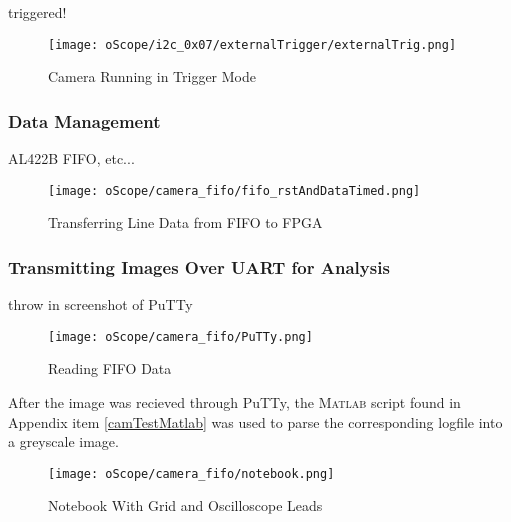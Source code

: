 \par
triggered!

\begin{figure}[H]
	\centerline{\texttt{[image: oScope/i2c\_0x07/externalTrigger/externalTrig.png]}}
	\caption{Camera Running in Trigger Mode}
	\label{camInTrigMode}
\end{figure}


\subsubsection{Data Management}
AL422B FIFO, etc...

\begin{figure}[H]
	\centerline{\texttt{[image: oScope/camera\_fifo/fifo\_rstAndDataTimed.png]}}
	\caption{Transferring Line Data from FIFO to FPGA}
	\label{fifoDataOut}
\end{figure}

\subsubsection{Transmitting Images Over UART for Analysis}
throw in screenshot of PuTTy
\begin{figure}[H]
	\centerline{\texttt{[image: oScope/camera\_fifo/PuTTy.png]}}
	\caption{Reading FIFO Data}
	\label{PuTTYfifoData}
\end{figure}

\par
After the image was recieved through PuTTy, the \textsc{Matlab} script found in Appendix item \ref{camTestMatlab} was used to parse the corresponding logfile into a greyscale image.
\begin{figure}[H]
	\centerline{\texttt{[image: oScope/camera\_fifo/notebook.png]}}
	\caption{Notebook With Grid and Oscilloscope Leads}
	\label{notebookImage}
\end{figure}